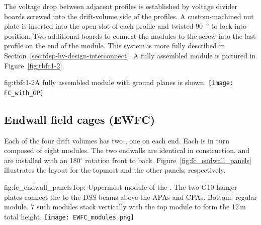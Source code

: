 The voltage drop between adjacent profiles is established by voltage divider boards screwed into the drift-volume side of the profiles. A custom-machined nut plate %
is inserted into the open slot of each profile and twisted \SI{90}{\degree} %
to lock into position. Two additional boards to connect the modules to the  %
screw into the last profile on the  end of the module. This system is %
more fully described in Section~\ref{sec:fdsp-hv-design-interconnect}. A fully assembled module is pictured in Figure~\ref{fig:tbfc1-2}.

\begin{dunefigure}{fig:tbfc1-2}{A fully assembled module with ground planes is shown.} %
\texttt{[image: FC\_with\_GP]}
\end{dunefigure}


\subsection{Endwall field cages (EWFC)}


Each of the four drift volumes has two , one on each end. Each  is in turn composed of eight  modules.  The two endwalls are identical in construction, and are installed with an 180$^\circ$ rotation front to back.
Figure~\ref{fig:fc_endwall_panels} illustrates the layout for the topmost 
and the other panels, respectively.

\begin{dunefigure}{fig:fc_endwall_panels}{Top: Uppermost module of the . The two G10 hanger plates connect the  to the DSS beams above the APAs and CPAs. Bottom: regular  module. 7 such modules stack vertically with the top module to form the 12\,m total height.}
\texttt{[image: EWFC\_modules.png]}
\end{dunefigure}

